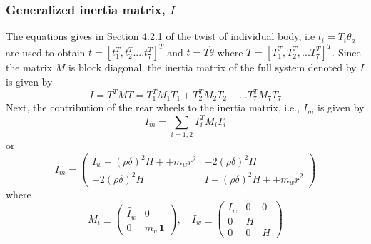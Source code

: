 \subsubsection{Generalized inertia matrix, $I$}
\label{sec:GIM}
 The equations gives in Section 4.2.1 of the twist of individual body, i.e $t_i=T_i\dot{\theta_a}$ are used to obtain   $t=[t_1^T, t_2^T....t_7^T]^T$ and $t=T\dot\theta$ where  $T=[T_1^T, T_2^T,... T_7^T]^T$. Since the matrix $M$ is block diagonal, the inertia matrix of the full system  denoted by $I$ is given by
\begin{equation}
I=T^TMT=T_1^TM_1T_1+T_2^TM_2T_2+...T_7^TM_7T_7
\end{equation}
Next, the contribution of the rear wheels  to the inertia matrix, i.e., $I_m$ is given by  \[ I_m=\sum_{i=1,2}T_i^TM_iT_i\] or
\begin{equation}
\label{eqn:I_wheel}
I_m=\begin{pmatrix}
I_w+(\rho\delta)^2H++m_wr^2 & -2(\rho\delta)^2H
\\
-2(\rho\delta)^2H &I+(\rho\delta)^2H++m_wr^2
\end{pmatrix} 
\end{equation}
where 
\begin{equation}
\label{eqn:wheelInertiaMatrix}
M_i \equiv\begin{pmatrix}
\tilde{I_w} &0\\0 & m_w\mathbf{1}
\end{pmatrix} , \quad\tilde{I_w}\equiv\begin{pmatrix}
I_w&0&0\\0&H&\\0&0&H
\end{pmatrix}
\end{equation} 

